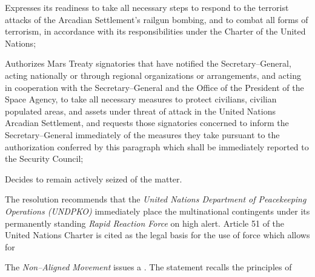 \item Expresses its readiness to take all necessary steps to respond to the terrorist attacks of the Arcadian Settlement's railgun bombing, and to combat all forms of terrorism, in accordance with its responsibilities under the Charter of the United Nations;

\item Authorizes Mars Treaty signatories that have notified the Secretary--General, acting nationally or through regional organizations or arrangements, and acting in cooperation with the Secretary--General and the Office of the President of the Space Agency, to take all necessary measures to protect civilians, civilian populated areas, and assets under threat of attack in the United Nations Arcadian Settlement, and requests those signatories concerned to inform the Secretary--General immediately of the measures they take pursuant to the authorization conferred by this paragraph which shall be immediately reported to the Security Council;

\item Decides to remain actively seized of the matter.%
\stopitemize
\stopTimelineGeneralDocument

The resolution recommends that the {\it United Nations Department of Peacekeeping Operations (UNDPKO)} immediately place the multinational contingents under its permanently standing {\it Rapid Reaction Force} on high alert. Article 51 of the United Nations Charter is cited as the legal basis for the use of force which allows for 
\StopTimelineDate

The {\it Non--Aligned Movement} issues a . The statement recalls the principles of 

